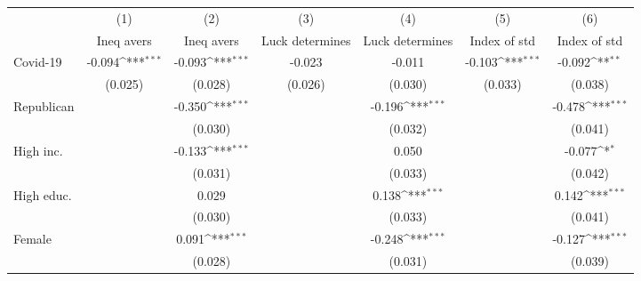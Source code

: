 {
\def\sym#1{\ifmmode^{#1}\else\(^{#1}\)\fi}
\begin{tabular}{l*{6}{c}}
\toprule
                    &\multicolumn{1}{c}{(1)}&\multicolumn{1}{c}{(2)}&\multicolumn{1}{c}{(3)}&\multicolumn{1}{c}{(4)}&\multicolumn{1}{c}{(5)}&\multicolumn{1}{c}{(6)}\\
                    &\multicolumn{1}{c}{Ineq avers}&\multicolumn{1}{c}{Ineq avers}&\multicolumn{1}{c}{Luck determines}&\multicolumn{1}{c}{Luck determines}&\multicolumn{1}{c}{Index of std}&\multicolumn{1}{c}{Index of std}\\
\midrule
Covid-19            &      -0.094\sym{***}&      -0.093\sym{***}&      -0.023         &      -0.011         &      -0.103\sym{***}&      -0.092\sym{**} \\
                    &     (0.025)         &     (0.028)         &     (0.026)         &     (0.030)         &     (0.033)         &     (0.038)         \\
\addlinespace
Republican          &                     &      -0.350\sym{***}&                     &      -0.196\sym{***}&                     &      -0.478\sym{***}\\
                    &                     &     (0.030)         &                     &     (0.032)         &                     &     (0.041)         \\
\addlinespace
High inc.           &                     &      -0.133\sym{***}&                     &       0.050         &                     &      -0.077\sym{*}  \\
                    &                     &     (0.031)         &                     &     (0.033)         &                     &     (0.042)         \\
\addlinespace
High educ.          &                     &       0.029         &                     &       0.138\sym{***}&                     &       0.142\sym{***}\\
                    &                     &     (0.030)         &                     &     (0.033)         &                     &     (0.041)         \\
\addlinespace
Female              &                     &       0.091\sym{***}&                     &      -0.248\sym{***}&                     &      -0.127\sym{***}\\
                    &                     &     (0.028)         &                     &     (0.031)         &                     &     (0.039)         \\

\end{tabular}}
